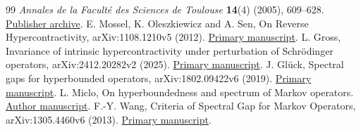 \documentclass[11pt]{article}
\begin{document}
\begin{thebibliography}{99}
\emph{Annales de la Facult\'e des Sciences de Toulouse}
\textbf{14}(4) (2005), 609--628.
\href{https://www.numdam.org/item/AFST_2005_6_14_4_609_0/}{Publisher archive}.
E. Mossel, K. Oleszkiewicz and A. Sen,
On Reverse Hypercontractivity, arXiv:1108.1210v5 (2012).
\href{https://arxiv.org/abs/1108.1210}{Primary manuscript}.
L. Gross, Invariance of intrinsic hypercontractivity under perturbation of
Schr\"odinger operators, arXiv:2412.20282v2 (2025).
\href{https://arxiv.org/abs/2412.20282}{Primary manuscript}.
J. Gl\"uck, Spectral gaps for hyperbounded operators,
arXiv:1802.09422v6 (2019).
\href{https://arxiv.org/abs/1802.09422}{Primary manuscript}.
L. Miclo, On hyperboundedness and spectrum of Markov operators.
\href{https://perso.math.univ-toulouse.fr/miclo/files/2012/04/hyperboundedness.pdf}{Author manuscript}.
F.-Y. Wang, Criteria of Spectral Gap for Markov Operators,
arXiv:1305.4460v6 (2013).
\href{https://arxiv.org/abs/1305.4460v6}{Primary manuscript}.
\end{thebibliography}
\end{document}

